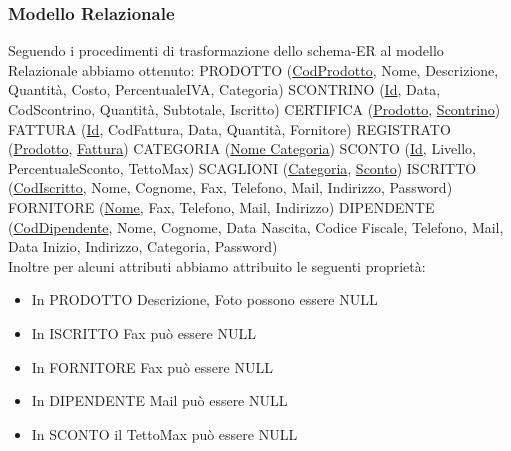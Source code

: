 \subsubsection{Modello Relazionale}

Seguendo i procedimenti di trasformazione dello schema-ER al modello Relazionale abbiamo ottenuto: \newline
PRODOTTO (\underline{CodProdotto}, Nome, Descrizione, Quantit\`a, Costo, PercentualeIVA, Categoria) \newline
SCONTRINO (\underline{Id}, Data, CodScontrino, Quantit\`a, Subtotale, Iscritto) \newline
CERTIFICA (\underline{Prodotto}, \underline{Scontrino}) \newline
FATTURA (\underline{Id}, CodFattura, Data, Quantit\`a, Fornitore) \newline
REGISTRATO (\underline{Prodotto}, \underline{Fattura}) \newline
CATEGORIA (\underline{Nome Categoria}) \newline
SCONTO (\underline{Id}, Livello, PercentualeSconto, TettoMax) \newline
SCAGLIONI (\underline{Categoria}, \underline{Sconto}) \newline
ISCRITTO (\underline{CodIscritto}, Nome, Cognome, Fax, Telefono, Mail, Indirizzo, Password) \newline
FORNITORE (\underline{Nome}, Fax, Telefono, Mail, Indirizzo) \newline
DIPENDENTE (\underline{CodDipendente}, Nome, Cognome, Data Nascita, Codice Fiscale, Telefono, Mail, Data Inizio, Indirizzo, Categoria, Password) \\

Inoltre per alcuni attributi abbiamo attribuito le seguenti propriet\`a:
\begin{itemize}
\item In PRODOTTO Descrizione, Foto possono essere NULL
\item In ISCRITTO Fax pu\`o essere NULL
\item In FORNITORE Fax pu\`o essere NULL
\item In DIPENDENTE Mail pu\`o essere NULL
\item In SCONTO il TettoMax pu\`o essere NULL

\end{itemize}


